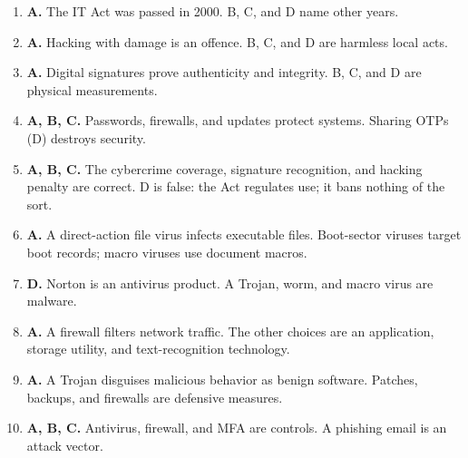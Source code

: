 \begin{enumerate}[label=\textbf{Q\arabic*.}, leftmargin=*]
\item \textbf{A.} The IT Act was passed in 2000. B, C, and D name other years.
\item \textbf{A.} Hacking with damage is an offence. B, C, and D are harmless local acts.
\item \textbf{A.} Digital signatures prove authenticity and integrity. B, C, and D are physical measurements.
\item \textbf{A, B, C.} Passwords, firewalls, and updates protect systems. Sharing OTPs (D) destroys security.
\item \textbf{A, B, C.} The cybercrime coverage, signature recognition, and hacking penalty are correct. D is false: the Act regulates use; it bans nothing of the sort.
\item \textbf{A.} A direct-action file virus infects executable files. Boot-sector viruses target boot records; macro viruses use document macros.

\item \textbf{D.} Norton is an antivirus product. A Trojan, worm, and macro virus are malware.

\item \textbf{A.} A firewall filters network traffic. The other choices are an application, storage utility, and text-recognition technology.

\item \textbf{A.} A Trojan disguises malicious behavior as benign software. Patches, backups, and firewalls are defensive measures.

\item \textbf{A, B, C.} Antivirus, firewall, and MFA are controls. A phishing email is an attack vector.

\end{enumerate}
